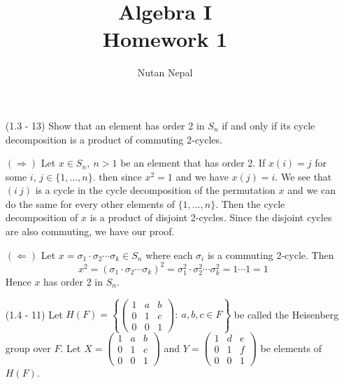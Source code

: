 \documentclass[12pt]{article}
\title{\textbf{Algebra I}\\
\large Homework 1
}
\author{Nutan Nepal}
\begin{document}
\maketitle
\makebox[\linewidth]{\rule{200mm}{1pt}}
\vspace{.1in}
\begin{enumerate}

\item[(1.3 - 13)] Show that an element has order 2 in 
    $S_n$ if and only if its cycle decomposition is a
    product of commuting 2-cycles.

\begin{mybox}

    $(\Longrightarrow)$
    Let $x\in S_n,\ n>1$ be an element that has order
    2. If $x(i)=j$ for some $i$, $j\in
    \{1,\ldots,n\}$. then since $x^2=1$ and we have $x(j)=i$.
    We see that $(i\ j)$ is a cycle in the cycle
    decomposition of the permutation $x$ and we can do
    the same for every other elements of $\{1,\ldots,n\}$.
    Then the cycle decomposition of $x$ is a product of
    disjoint 2-cycles. Since the disjoint cycles are also
    commuting, we have our proof.

    \vspace*{2mm}
    $(\Longleftarrow)$
    Let $x=\sigma_1\cdot\sigma_2\cdots\sigma_k \in S_n$
    where
    each $\sigma_i$ is a commuting 2-cycle. Then
    $$x^2=(\sigma_1\cdot\sigma_2\cdots\sigma_k)^2
    =\sigma_1^2\cdot\sigma_2^2\cdots\sigma_k^2
    =1\cdots 1=1$$
    Hence $x$ has order 2 in $S_n$.
\end{mybox}


\item[(1.4 - 11)] Let $H(F)=\left\{\left(\begin{array}{ccc}
    1 & a & b\\
    0 & 1 & c\\
    0 & 0 & 1 \end{array}
    \right):\ a,b,c\in F\right\}$ be called the Heisenberg
    group over $F$. Let $X=\left(\begin{array}{ccc}
        1 & a & b\\
        0 & 1 & c\\
        0 & 0 & 1 \end{array}
        \right)$
    and $Y=\left(\begin{array}{ccc}
        1 & d & e\\
        0 & 1 & f\\
        0 & 0 & 1 \end{array}
        \right)$ be elements of $H(F)$.
    \begin{enumerate}


\end{enumerate}
\end{enumerate}
\end{document}
